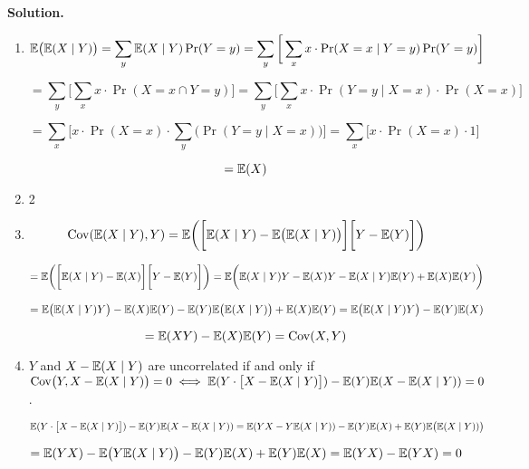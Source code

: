 \textbf{Solution.} \begin{enumerate}[(1)]

\item 

\[
\E\big(\E(X\mid Y)\big) = \sum_y \E(X \mid Y) \Pr(Y = y) = \sum_y \bigg[ \sum_x x \cdot \Pr(X = x \mid Y = y) \Pr(Y = y) \bigg]
\]

\[
= \sum_y \bigg[ \sum_x x \cdot \Pr(X = x \cap Y = y) \bigg] = \sum_y \bigg[ \sum_x x \cdot \Pr(Y= y \mid X = x) \cdot \Pr(X = x) \bigg]
\]

\[
= \sum_x \bigg[ x \cdot \Pr(X = x) \cdot \sum_y \big( \Pr(Y= y \mid X = x) \big) \bigg] = \sum_x \bigg[ x \cdot \Pr(X = x) \cdot 1 \bigg]
\]

\[
= \E(X)
\]

\item 2
%
%
%
%
%
%

\item 

\[
\Cov(\E(X \mid Y) , Y) = \E \bigg( \bigg[\E(X \mid Y) - \E \big(\E(X \mid Y) \big) \bigg] \bigg[Y - \E(Y) \bigg] \bigg)
\]

\[
= \E \bigg( \bigg[\E(X \mid Y) - \E (X) \bigg] \bigg[Y - \E(Y) \bigg] \bigg) = \E \bigg( \E(X \mid Y)Y  - \E (X) Y -  \E(X \mid Y)\E(Y) +  \E(X)\E(Y)  \bigg)
\]

\[
= \E \big( \E(X \mid Y)Y\big)  -  \E (X) \E( Y)  - \E(Y) \E \big( \E(X \mid Y) \big) +   \E(X)\E(Y) = \E \big( \E(X \mid Y)Y\big)  - \E(Y) \E(X)
\]

\[
= \E(XY) - \E(X) \E(Y) = \Cov(X, Y)
\]

\item \(Y\) and \(X  - \E(X \mid Y)\) are uncorrelated if and only if \( \Cov \big(Y, X - \E(X \mid Y) \big) = 0 \iff \E(Y \cdot \big[ X - \E(X \mid Y)\big] ) - \E(Y) \E( X - \E(X \mid Y)) = 0 \).

\[
\E(Y \cdot \big[ X - \E(X \mid Y)\big] ) -  \E(Y) \E( X - \E(X \mid Y))= \E(Y X - Y \E(X \mid Y) ) -  \E(Y) \E( X) +  \E(Y) \E \big( \E(X \mid Y)) \big)
\]

\[
= \E(Y X) - \E\big( Y \E(X \mid Y) \big) -  \E(Y) \E( X)  + \E(Y) \E(X) = \E(YX) - \E(YX) = 0
\]

\end{enumerate}

